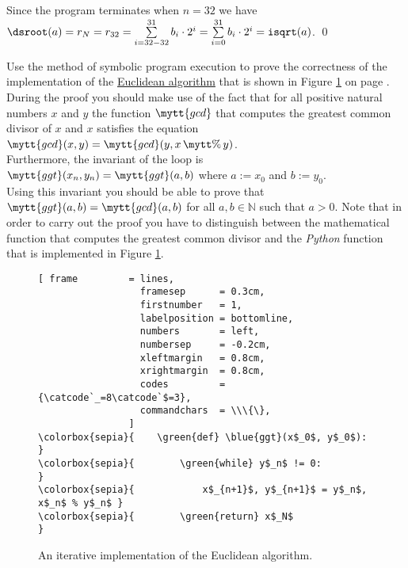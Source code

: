 Since the program terminates when $n=32$ we have
\\[0.2cm]
\hspace*{1.3cm}
$\ds \mathtt{root}(a) = r_N = r_{32} = \sum\limits_{i=32-32}^{31} b_i \cdot 2^i = \sum\limits_{i=0}^{31} b_i \cdot 2^i = \mathtt{isqrt}(a)$. \qed
\pagebreak

\exerciseEng
Use the method of symbolic program execution to prove the correctness of the implementation of the
\href{https://en.wikipedia.org/wiki/Euclidean_algorithm}{Euclidean algorithm} that is shown in Figure
\ref{fig:gcd.stlx} on page \pageref{fig:gcd.stlx}.  During the proof 
you should make use of the fact that for all positive natural numbers $x$ and $y$ the function $\mytt{gcd}$
that computes the greatest common divisor of $x$ and $x$ satisfies the equation
\\[0.2cm]
\hspace*{1.3cm}
$\mytt{gcd}(x, y) = \mytt{gcd}(y, x \,\mytt{\%}\, y)$.
\\[0.2cm]
Furthermore, the invariant of the  loop is
\\[0.2cm]
\hspace*{1.3cm}
$\mytt{ggt}(x_n, y_n) = \mytt{ggt}(a, b)$ \quad where $a := x_0$ and $b := y_0$.
\\[0.2cm]
Using this invariant you should be able to prove that $\mytt{ggt}(a, b) = \mytt{gcd}(a, b)$ for all
$a, b \in \mathbb{N}$ such that $a > 0$.  Note that in order to carry out the proof you have to distinguish
between the mathematical function  that computes the greatest common divisor and the \textsl{Python}
function  that is implemented in Figure \ref{fig:gcd.stlx}.
\eox

\begin{figure}[!ht]
\centering
\begin{Verbatim}[ frame         = lines, 
                  framesep      = 0.3cm, 
                  firstnumber   = 1,
                  labelposition = bottomline,
                  numbers       = left,
                  numbersep     = -0.2cm,
                  xleftmargin   = 0.8cm,
                  xrightmargin  = 0.8cm,
                  codes         = {\catcode`_=8\catcode`$=3},
                  commandchars  = \\\{\},
                ]
\colorbox{sepia}{    \green{def} \blue{ggt}(x$_0$, y$_0$):               }
\colorbox{sepia}{        \green{while} y$_n$ != 0:                       }
\colorbox{sepia}{            x$_{n+1}$, y$_{n+1}$ = y$_n$, x$_n$ % y$_n$ }
\colorbox{sepia}{        \green{return} x$_N$                            }
\end{Verbatim}
\vspace*{-0.3cm}
\caption{An iterative implementation of the Euclidean algorithm.}
\label{fig:gcd.stlx}
\end{figure}

